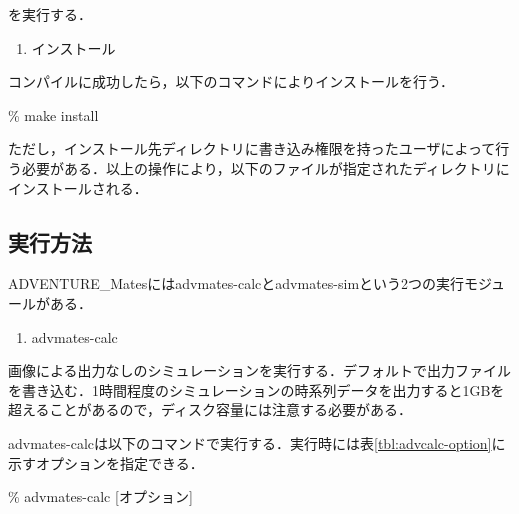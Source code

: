 を実行する．\\

\begin{enumerate}
  \setcounter{enumi}{\value{buildnum}}
  \renewcommand{\labelenumi}{(\arabic{enumi})}
\item インストール
  \setcounter{buildnum}{\value{enumi}}
\end{enumerate}

コンパイルに成功したら，以下のコマンドによりインストールを行う．

\begin{screen}
  \% make install
\end{screen}

ただし，インストール先ディレクトリに書き込み権限を持ったユーザによって行う必要がある．以上の操作により，以下のファイルが指定されたディレクトリにインストールされる．

\subsection{実行方法}
\label{subsect:execution}

ADVENTURE\_Matesにはadvmates-calcとadvmates-simという2つの実行モジュールがある．

\begin{enumerate}
  \renewcommand{\labelenumi}{(\arabic{enumi})}
\item advmates-calc
  \setcounter{execnum}{\value{enumi}}
\end{enumerate}

画像による出力なしのシミュレーションを実行する．デフォルトで出力ファイルを書き込む．1時間程度のシミュレーションの時系列データを出力すると1GBを超えることがあるので，ディスク容量には注意する必要がある．

advmates-calcは以下のコマンドで実行する．実行時には表\ref{tbl:advcalc-option}に示すオプションを指定できる．

\begin{screen}
  \% advmates-calc [オプション]
\end{screen}

